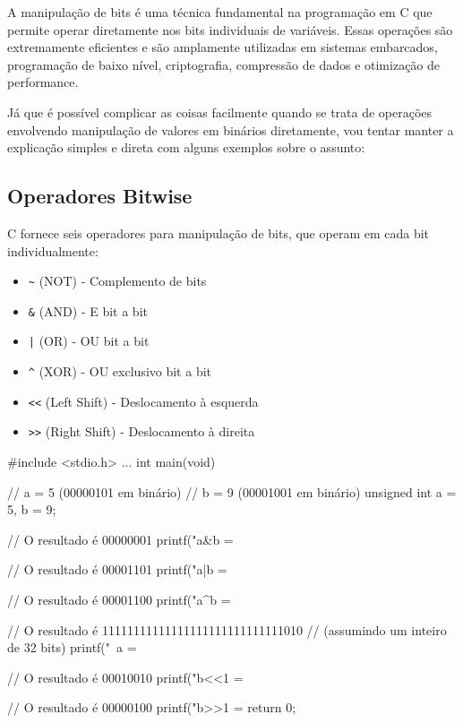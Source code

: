 A manipulação de bits é uma técnica fundamental na programação em C que permite operar 
diretamente nos bits individuais de variáveis. Essas operações são extremamente eficientes 
e são amplamente utilizadas em sistemas embarcados, programação de baixo nível, criptografia, 
compressão de dados e otimização de performance.

Já que é possível complicar as coisas facilmente quando se trata de operações envolvendo manipulação 
de valores em binários diretamente, vou tentar manter a explicação simples e direta com 
alguns exemplos sobre o assunto:

\subsection{Operadores Bitwise}

C fornece seis operadores para manipulação de bits, que operam em cada bit individualmente:

\begin{itemize}
    \item \texttt{\~} (NOT) - Complemento de bits
    \item \texttt{\&} (AND) - E bit a bit
    \item \texttt{|} (OR) - OU bit a bit
    \item \texttt{\^} (XOR) - OU exclusivo bit a bit
    \item \texttt{<<} (Left Shift) - Deslocamento à esquerda
    \item \texttt{>>} (Right Shift) - Deslocamento à direita
\end{itemize}

\newpage
\begin{excode} #include <stdio.h>
    ...
    int main(void)
    {

        // a = 5 (00000101 em binário)
        // b = 9 (00001001 em binário)
        unsigned int a = 5, b = 9;

        // O resultado é 00000001
        printf("a&b = %

        // O resultado é 00001101
        printf("a|b = %

        // O resultado é 00001100
        printf("a^b = %

        // O resultado é 11111111111111111111111111111010
        // (assumindo um inteiro de 32 bits)
        printf("~a = %

        // O resultado é 00010010
        printf("b<<1 = %

        // O resultado é 00000100
        printf("b>>1 = %
        return 0;
        }
\end{excode}

